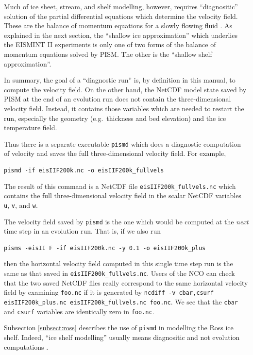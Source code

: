 \documentclass[11pt,final]{amsart}
\begin{document}
Much of ice sheet, stream, and shelf modelling, however, requires ``diagnositic'' solution of the partial differential equations which determine the velocity field.  These are the balance of momentum equations for a slowly flowing fluid \cite{Fowler}.  As explained in the next section, the ``shallow ice approximation'' which underlies the EISMINT II experiments is only one of two forms of the balance of momentum equations solved by PISM.  The other is the ``shallow shelf approximation''.

In summary, the goal of a ``diagnostic run'' is, by definition in this manual, to compute the velocity field.  On the other hand, the NetCDF model state saved by PISM at the end of an evolution run does not contain the three-dimensional velocity field.  Instead, it contains those variables which are needed to restart the run, especially the geometry (e.g.~thickness and bed elevation) and the ice temperature field.

Thus there is a separate executable \verb|pismd| which does a diagnostic computation of velocity and saves the full three-dimensional velocity field.  For example, 

\verb|pismd -if eisIIF200k.nc -o eisIIF200k_fullvels|

\noindent The result of this command is a NetCDF file \verb|eisIIF200k_fullvels.nc| which contains the full three-dimensional velocity field in the scalar NetCDF variables \verb|u|, \verb|v|, and \verb|w|.

The velocity field saved by \verb|pismd| is the one which would be computed at the \emph{next} time step in an evolution run.  That is, if we also run

\verb|pisms -eisII F -if eisIIF200k.nc -y 0.1 -o eisIIF200k_plus|

\noindent then the horizontal velocity field computed in this single time step run is the same as that saved in \verb|eisIIF200k_fullvels.nc|.  Users of the NCO can check that the two saved NetCDF files really correspond to the same horizontal velocity field by examining \verb|foo.nc| if it is generated by \verb|ncdiff -v cbar,csurf eisIIF200k_plus.nc eisIIF200k_fullvels.nc foo.nc|.  We see that the \verb|cbar| and \verb|csurf| variables are identically zero in \verb|foo.nc|.

Subsection \ref{subsect:ross} describes the use of \verb|pismd| in modelling the Ross ice shelf.  Indeed, ``ice shelf modelling'' usually means diagnositic and not evolution computations \cite{MacAyealetal,HumbertGreveHutter}.
\end{document}
